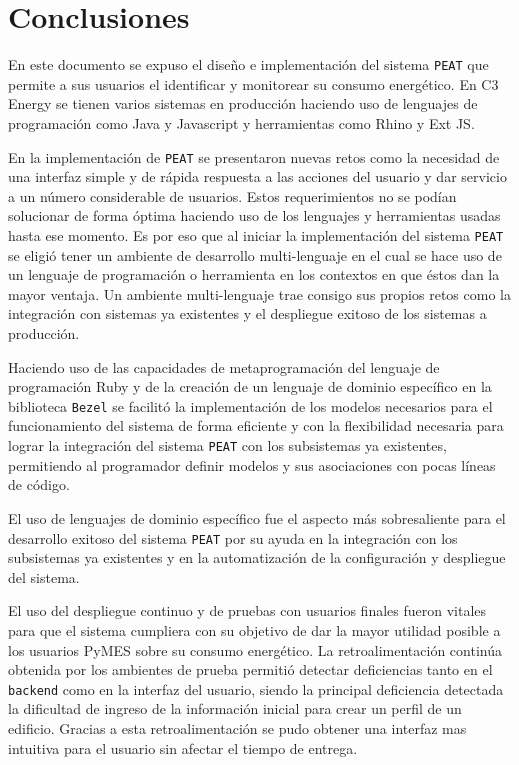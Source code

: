 \chapter{Conclusiones}

En este documento se expuso el diseño e implementación del sistema \texttt{PEAT} que
permite a sus usuarios el identificar y monitorear su consumo energético. En C3
Energy se tienen varios sistemas en producción haciendo uso de lenguajes de
programación como Java y Javascript y herramientas como Rhino y Ext JS.

En la implementación de \texttt{PEAT} se presentaron nuevas retos como la necesidad
de una interfaz simple y de rápida respuesta a las acciones del usuario y
dar servicio a un número considerable de usuarios.
Estos requerimientos no se podían solucionar de forma óptima haciendo uso de los
lenguajes y herramientas usadas hasta ese momento. Es por eso que al iniciar
la implementación del sistema \texttt{PEAT} se eligió tener un ambiente de
desarrollo multi-lenguaje en el cual se hace uso de un lenguaje de programación
o herramienta en los contextos en que éstos dan la mayor ventaja. Un ambiente
multi-lenguaje trae consigo sus propios retos como la integración con sistemas ya
existentes y el despliegue exitoso de los sistemas a producción.

Haciendo uso de las capacidades de metaprogramación del lenguaje de programación
Ruby y de la creación de un lenguaje de dominio específico en la biblioteca
\texttt{Bezel} se facilitó la implementación de los modelos necesarios para
el funcionamiento del sistema de forma eficiente y con la flexibilidad necesaria
para lograr la integración del sistema \texttt{PEAT} con los subsistemas ya
existentes, permitiendo al programador definir modelos y sus asociaciones con
pocas líneas de código.

El uso de lenguajes de dominio específico fue el aspecto más sobresaliente
para el desarrollo exitoso del sistema \texttt{PEAT} por su ayuda en la
integración con los subsistemas ya existentes y en la automatización de la
configuración y despliegue del sistema.

El uso del despliegue continuo y de pruebas con usuarios finales fueron vitales para
que el sistema cumpliera con su objetivo de dar la mayor utilidad posible
a los usuarios PyMES sobre su consumo energético. La retroalimentación continúa
obtenida por los ambientes de prueba permitió detectar deficiencias tanto en el
\texttt{backend} como en la interfaz del usuario, siendo la principal deficiencia
detectada la dificultad de ingreso de la información inicial para crear un perfil
de un edificio. Gracias a esta retroalimentación se pudo obtener una interfaz
mas intuitiva para el usuario sin afectar el tiempo de entrega.

